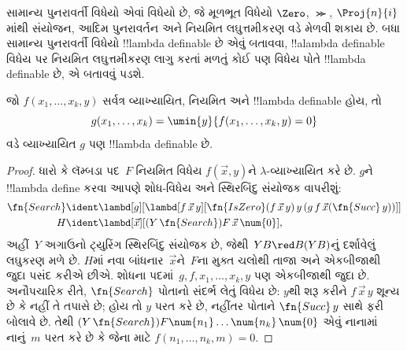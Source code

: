 \documentclass[../../../include/open-logic-section]{subfiles}
\begin{document}

સામાન્ય પુનરાવર્તી વિધેયો એવાં વિધેયો છે, જે મૂળભૂત
વિધેયો $\Zero$, $\Succ$, $\Proj{n}{i}$માંથી સંયોજન,
આદિમ પુનરાવર્તન અને નિયમિત લઘુત્તમીકરણ વડે મેળવી
શકાય છે. બધા સામાન્ય પુનરાવર્તી વિધેયો
!!{lambda definable} છે એવું બતાવવા, !!a{lambda
  definable} વિધેય પર નિયમિત લઘુત્તમીકરણ લાગુ કરતાં
મળતું કોઈ પણ વિધેય પોતે !!{lambda definable} છે,
એ બતાવવું પડશે.

\begin{lem}
   જો $f(x_1, \dots, x_k, y)$
  સર્વત્ર વ્યાખ્યાયિત, નિયમિત અને !!{lambda definable} હોય, તો
  \[
  g(x_1, \dots, x_k) = \umin{y}{f(x_1,\dots,x_k, y) = 0}
  \]
  વડે વ્યાખ્યાયિત $g$ પણ !!{lambda definable} છે.
\end{lem}

\begin{proof}
  ધારો કે લૅમ્બડા પદ~$F$ નિયમિત વિધેય
  $f(\vec x, y)$ને $\lambda$-વ્યાખ્યાયિત કરે છે.
  $g$ને !!{lambda define} કરવા આપણે શોધ-વિધેય
  અને સ્થિરબિંદુ સંયોજક વાપરીશું:
  \begin{align*}
    \fn{Search} & \ident \lambd[g][\lambd[f\,\vec{x}\,y][
        \fn{IsZero} (f\, \vec{x}\, y)\, y\, (g\,f\, \vec{x} (\fn{Succ}\, y))]]\\
    H & \ident \lambd[\vec x][(Y \, \fn{Search}) F\, \vec{x}\, \num{0}],
  \end{align*}
  અહીં~$Y$ અગાઉનો ટ્યુરિંગ સ્થિરબિંદુ સંયોજક છે,
  જેથી~$YB\red B(YB)$નું દર્શાવેલું લઘુકરણ મળે છે.
  $H$માં નવા બાંધનાર~$\vec x$ને~$F$ના મુક્ત ચલોથી
  તાજા અને એકબીજાથી જુદા પસંદ કરીએ છીએ.
  શોધના પદમાં~$g,f,x_1,\ldots,x_k,y$ પણ એકબીજાથી જુદા છે.
  અનૌપચારિક રીતે, $\fn{Search}$ પોતાનો સંદર્ભ લેતું
  વિધેય છે: $y$થી શરૂ કરીને $f\,\vec x\,y$
  શૂન્ય છે કે નહીં તે તપાસે છે; હોય તો $y$ પરત કરે
  છે, નહીંતર પોતાને $\fn{Succ}\,y$ સાથે ફરી
  બોલાવે છે. તેથી $(Y \, \fn{Search}) F
  \num{n_1}\dots\num{n_k}\,\num{0}$ એવું નાનામાં
  નાનું~$m$ પરત કરે છે કે જેના માટે $f(n_1,
  \dots, n_k, m) = 0$.


\end{proof}
\end{document}
